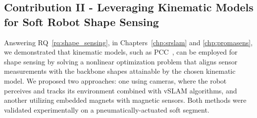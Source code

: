 \subsection{Contribution II - Leveraging Kinematic Models for Soft Robot Shape Sensing}
Answering \gls{RQ}~\ref{rq:shape_sensing}, in Chapters~\ref{chp:srslam} and \ref{chp:promasens}, we demonstrated that kinematic models, such as \gls{PCC}~\citep{webster2010design}, can be employed for shape sensing by solving a nonlinear optimization problem that aligns sensor measurements with the backbone shapes attainable by the chosen kinematic model. We proposed two approaches: one using cameras, where the robot perceives and tracks its environment combined with \gls{vSLAM} algorithms, and another utilizing embedded magnets with magnetic sensors. Both methods were validated experimentally on a pneumatically-actuated soft segment.


